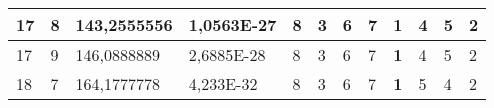 \documentclass[conference]{IEEEtran}
\begin{document}
\begin{table*}[]
\begin{tabular}{|llll|llllllll|}
\multicolumn{1}{|l|}{17}                                                             & \multicolumn{1}{l|}{8}                                                                 & \multicolumn{1}{l|}{143,2555556}                                                           & 1,0563E-27                              & \multicolumn{1}{l|}{8}                                                           & \multicolumn{1}{l|}{3}                                                           & \multicolumn{1}{l|}{6}                                                           & \multicolumn{1}{l|}{7}                                                           & \multicolumn{1}{l|}{\textbf{1}}                                                  & \multicolumn{1}{l|}{4}                                                           & \multicolumn{1}{l|}{5}                                                           & 2                                   \\ \hline
\multicolumn{1}{|l|}{17}                                                             & \multicolumn{1}{l|}{9}                                                                 & \multicolumn{1}{l|}{146,0888889}                                                           & 2,6885E-28                              & \multicolumn{1}{l|}{8}                                                           & \multicolumn{1}{l|}{3}                                                           & \multicolumn{1}{l|}{6}                                                           & \multicolumn{1}{l|}{7}                                                           & \multicolumn{1}{l|}{\textbf{1}}                                                  & \multicolumn{1}{l|}{4}                                                           & \multicolumn{1}{l|}{5}                                                           & 2                                   \\ \hline
\multicolumn{1}{|l|}{18}                                                             & \multicolumn{1}{l|}{7}                                                                 & \multicolumn{1}{l|}{164,1777778}                                                           & 4,233E-32                               & \multicolumn{1}{l|}{8}                                                           & \multicolumn{1}{l|}{3}                                                           & \multicolumn{1}{l|}{6}                                                           & \multicolumn{1}{l|}{7}                                                           & \multicolumn{1}{l|}{\textbf{1}}                                                  & \multicolumn{1}{l|}{5}                                                           & \multicolumn{1}{l|}{4}                                                           & 2                                   \\ \hline

\end{tabular}
\end{table*}
\end{document}
